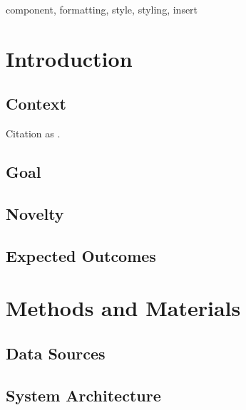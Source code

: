 \documentclass[conference]{IEEEtran}
\begin{document}
\begin{abstract}
\blindtext
\end{abstract}

\begin{IEEEkeywords}
component, formatting, style, styling, insert
\end{IEEEkeywords}




\section{Introduction}
\subsection{Context}
\par Citation as \cite{UserManual}.

\par \blindtext



\subsection{Goal}
\par \blindtext


\subsection{Novelty}
\par \blindtext



\subsection{Expected Outcomes}
\par \blindtext

 
\section{Methods and Materials}
\subsection{Data Sources}
\par \blindtext

\subsection{System Architecture}
\par \blindtext
\end{document}

